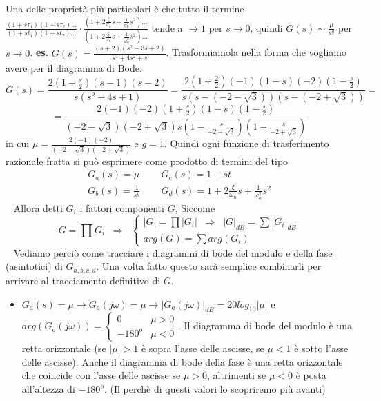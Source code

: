 \newline
Una delle proprietà più particolari è che tutto il termine $\frac{(1 + s \tau_1)(1 + s \tau_2)\dots}{(1 + s t_1)(1 + s t_2)\dots} \cdot \frac{(1 + 2 \frac{\zeta}{\sigma_n}s + \frac{1}{\sigma_n^2}s^2)\dots}{(1 + 2 \frac{\xi}{\omega_n} s + \frac{1}{\omega_n^2}s^2)\dots}$ tende a $\rightarrow  1$ per $s \rightarrow 0$, quindi $G(s) \sim \frac{\mu}{s^g}$ per $s \rightarrow  0$.\newline
\newline
\textbf{es.} $G(s) = \frac{(s+2)(s^2-3s+2)}{s^3 + 4 s^2 + s}$.\newline
Trasformiamola nella forma che vogliamo avere per il diagramma di Bode:
\[
    G(s) = \frac{2(1+\frac{s}{2})(s-1)(s-2)}{s(s^2+4s+1)} = \frac{2(1+ \frac{2}{2})(-1)(1-s)(-2)(1-\frac{s}{2})}{s(s-(-2-\sqrt{3}))(s-(-2+\sqrt{3}))}=
\]
\[
    = \frac{2(-1)(-2)(1+\frac{s}{2})(1-s)(1-\frac{s}{2})}{(-2-\sqrt{3})(-2+\sqrt{3})s(1-\frac{s}{-2-\sqrt{3}})(1-\frac{s}{-2+\sqrt{3}})}
\]
in cui $\mu= \frac{2(-1)(-2)}{(-2-\sqrt{3})(-2+\sqrt{3})}$ e $g=1$.\newline
\newline
\newline
Quindi ogni funzione di trasferimento razionale fratta si può esprimere come prodotto di termini del tipo 
\[
    \begin{matrix}
        G_a(s) = \mu & \;\; & G_c(s) = 1+ s t\\
        G_b(s) = \frac{1}{s^g} & \;\; & G_d(s) = 1 + 2 \frac{\xi}{\omega_n}s + \frac{1}{\omega_n^2}s^2
    \end{matrix}
\]
\ \newline
\newline
Allora detti $G_i$ i fattori componenti $G$, Siccome
\[
    G=\prod G_i \;\; \Longrightarrow \;\; \begin{cases}
        |G| = \prod |G_i| \;\; \Longrightarrow \;\; |G|_{dB} = \sum |G_i|_{dB}\\
        arg(G) = \sum arg(G_i)
    \end{cases}
\]
\ \newline
\newline
Vediamo perciò come tracciare i diagrammi di bode del modulo e della fase (asintotici) di $G_{a,b,c,d}$. Una volta fatto questo sarà semplice combinarli per arrivare al tracciamento definitivo di $G$.
\begin{itemize}
    \item $G_a(s) = \mu \rightarrow  G_a(j \omega) = \mu \rightarrow |G_a(j \omega)|_{dB} = 20 log_10|\mu|$ e $arg(G_a(j \omega)) = \begin{cases}
        0 \;\;\; & \mu>0\\
        -180^o & \mu<0
    \end{cases}$.\newline
    Il diagramma di bode del modulo è una retta orizzontale (se $|\mu| > 1$ è sopra l'asse delle ascisse, se $\mu < 1$ è sotto l'asse delle ascisse).\newline
Anche il diagramma di bode della fase è una retta orizzontale che coincide con l'asse delle ascisse se $\mu>0$, altrimenti se $\mu<0$ è posta all'altezza di $-180^o$. (Il perchè di questi valori lo scopriremo più avanti)
\end{itemize}
